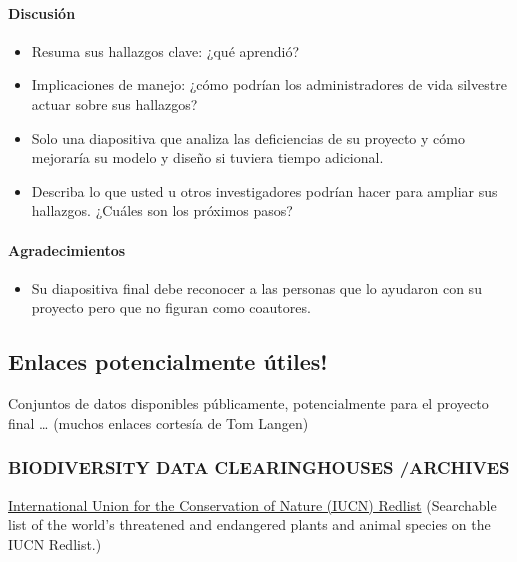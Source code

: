 \documentclass[
]{article}
\providecommand{\tightlist}{%
  \setlength{\itemsep}{0pt}\setlength{\parskip}{0pt}}
\begin{document}
\hypertarget{discusiuxf3n-1}{%
\paragraph{Discusión}\label{discusiuxf3n-1}}

\begin{itemize}
\item
  Resuma sus hallazgos clave: ¿qué aprendió?
\item
  Implicaciones de manejo: ¿cómo podrían los administradores de vida
  silvestre actuar sobre sus hallazgos?
\item
  Solo una diapositiva que analiza las deficiencias de su proyecto y
  cómo mejoraría su modelo y diseño si tuviera tiempo adicional.
\item
  Describa lo que usted u otros investigadores podrían hacer para
  ampliar sus hallazgos. ¿Cuáles son los próximos pasos?
\end{itemize}

\hypertarget{agradecimientos}{%
\paragraph{Agradecimientos}\label{agradecimientos}}

\begin{itemize}
\tightlist
\item
  Su diapositiva final debe reconocer a las personas que lo ayudaron con
  su proyecto pero que no figuran como coautores.
\end{itemize}

\hypertarget{enlaces-potencialmente-uxfatiles}{%
\subsection{Enlaces potencialmente
útiles!}\label{enlaces-potencialmente-uxfatiles}}

Conjuntos de datos disponibles públicamente, potencialmente para el
proyecto final \ldots{} (muchos enlaces cortesía de Tom Langen)

\hypertarget{biodiversity-data-clearinghouses-archives}{%
\subsubsection{BIODIVERSITY DATA CLEARINGHOUSES
/ARCHIVES}\label{biodiversity-data-clearinghouses-archives}}

\href{http://www.iucnredlist.org/}{International Union for the
Conservation of Nature (IUCN) Redlist} (Searchable list of the world's
threatened and endangered plants and animal species on the IUCN
Redlist.)
\end{document}
